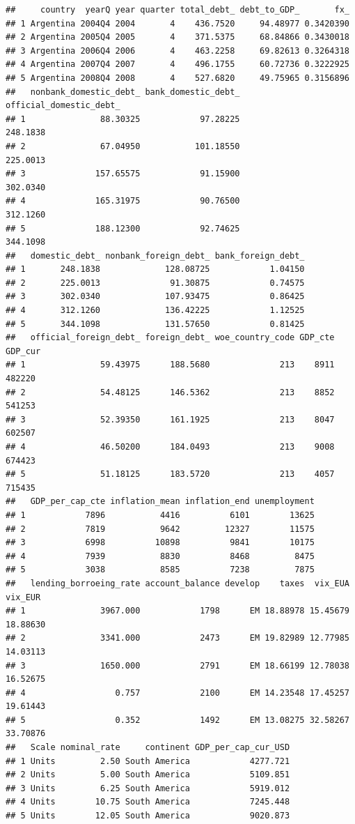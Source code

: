 \documentclass[]{article}
\begin{document}
\begin{verbatim}
##     country  yearQ year quarter total_debt_ debt_to_GDP_       fx_
## 1 Argentina 2004Q4 2004       4    436.7520     94.48977 0.3420390
## 2 Argentina 2005Q4 2005       4    371.5375     68.84866 0.3430018
## 3 Argentina 2006Q4 2006       4    463.2258     69.82613 0.3264318
## 4 Argentina 2007Q4 2007       4    496.1755     60.72736 0.3222925
## 5 Argentina 2008Q4 2008       4    527.6820     49.75965 0.3156896
##   nonbank_domestic_debt_ bank_domestic_debt_ official_domestic_debt_
## 1               88.30325            97.28225                248.1838
## 2               67.04950           101.18550                225.0013
## 3              157.65575            91.15900                302.0340
## 4              165.31975            90.76500                312.1260
## 5              188.12300            92.74625                344.1098
##   domestic_debt_ nonbank_foreign_debt_ bank_foreign_debt_
## 1       248.1838             128.08725            1.04150
## 2       225.0013              91.30875            0.74575
## 3       302.0340             107.93475            0.86425
## 4       312.1260             136.42225            1.12525
## 5       344.1098             131.57650            0.81425
##   official_foreign_debt_ foreign_debt_ woe_country_code GDP_cte GDP_cur
## 1               59.43975      188.5680              213    8911  482220
## 2               54.48125      146.5362              213    8852  541253
## 3               52.39350      161.1925              213    8047  602507
## 4               46.50200      184.0493              213    9008  674423
## 5               51.18125      183.5720              213    4057  715435
##   GDP_per_cap_cte inflation_mean inflation_end unemployment
## 1            7896           4416          6101        13625
## 2            7819           9642         12327        11575
## 3            6998          10898          9841        10175
## 4            7939           8830          8468         8475
## 5            3038           8585          7238         7875
##   lending_borroeing_rate account_balance develop    taxes  vix_EUA  vix_EUR
## 1               3967.000            1798      EM 18.88978 15.45679 18.88630
## 2               3341.000            2473      EM 19.82989 12.77985 14.03113
## 3               1650.000            2791      EM 18.66199 12.78038 16.52675
## 4                  0.757            2100      EM 14.23548 17.45257 19.61443
## 5                  0.352            1492      EM 13.08275 32.58267 33.70876
##   Scale nominal_rate     continent GDP_per_cap_cur_USD
## 1 Units         2.50 South America            4277.721
## 2 Units         5.00 South America            5109.851
## 3 Units         6.25 South America            5919.012
## 4 Units        10.75 South America            7245.448
## 5 Units        12.05 South America            9020.873
\end{verbatim}
\end{document}
